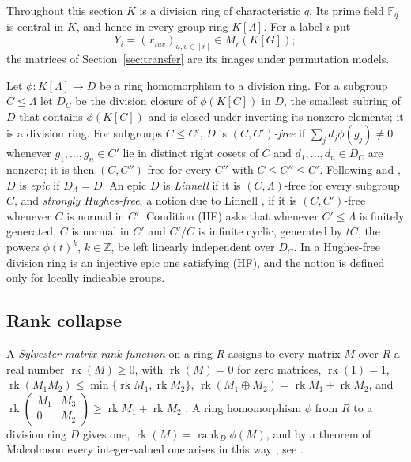 \documentclass[11pt]{article}
\theoremstyle{definition}
\theoremstyle{remark}
\numberwithin{equation}{section}
\DeclareMathOperator{\rank}{rank}
\DeclareMathOperator{\rk}{rk}
\newcommand{\F}{\mathbb F}
\newcommand{\Z}{\mathbb Z}
\begin{document}
Throughout this section $K$ is a division ring of characteristic $q$. Its prime field $\F_q$ is central in $K$, and hence in every group ring $K[\Lambda]$. For a label $i$ put
\[
 Y_i=(x_{iuv})_{u,v\in[r]}\in M_r(K[G]);
\]
the matrices of Section~\ref{sec:transfer} are its images under permutation models.

Let $\phi\colon K[\Lambda]\to D$ be a ring homomorphism to a division ring. For a subgroup $C\le\Lambda$ let $D_C$ be the division closure of $\phi(K[C])$ in $D$, the smallest subring of $D$ that contains $\phi(K[C])$ and is closed under inverting its nonzero elements; it is a division ring. For subgroups $C\le C'$, $D$ is \emph{$(C,C')$-free} if $\sum_jd_j\phi(g_j)\ne0$ whenever $g_1,\dots,g_n\in C'$ lie in distinct right cosets of $C$ and $d_1,\dots,d_n\in D_C$ are nonzero; it is then $(C,C'')$-free for every $C''$ with $C\le C''\le C'$. Following \cite[Section~2.3]{JZL2025} and \cite[Definition~2.2]{FSP2026}, $D$ is \emph{epic} if $D_\Lambda=D$. An epic $D$ is \emph{Linnell} if it is $(C,\Lambda)$-free for every subgroup $C$, and \emph{strongly Hughes-free}, a notion due to Linnell \cite{Linnell2006}, if it is $(C,C')$-free whenever $C$ is normal in $C'$. Condition (HF) asks that whenever $C'\le\Lambda$ is finitely generated, $C$ is normal in $C'$ and $C'/C$ is infinite cyclic, generated by $tC$, the powers $\phi(t)^k$, $k\in\Z$, be left linearly independent over $D_C$. In \cite[Definition~2.2(1)]{FSP2026} a Hughes-free division ring is an injective epic one satisfying (HF), and the notion is defined only for locally indicable groups.

\subsection{Rank collapse}

A \emph{Sylvester matrix rank function} on a ring $R$ assigns to every matrix $M$ over $R$ a real number $\rk(M)\ge0$, with $\rk(M)=0$ for zero matrices, $\rk(1)=1$, $\rk(M_1M_2)\le\min\{\rk M_1,\rk M_2\}$, $\rk(M_1\oplus M_2)=\rk M_1+\rk M_2$, and $\rk\left(\begin{smallmatrix}M_1&M_3\\0&M_2\end{smallmatrix}\right)\ge\rk M_1+\rk M_2$ \cite[Section~2.5]{FSP2026}. A ring homomorphism $\phi$ from $R$ to a division ring $D$ gives one, $\rk(M)=\rank_D\phi(M)$, and by a theorem of Malcolmson every integer-valued one arises in this way \cite{Malcolmson1980}; see \cite[Section~2.5]{FSP2026}.
\end{document}
